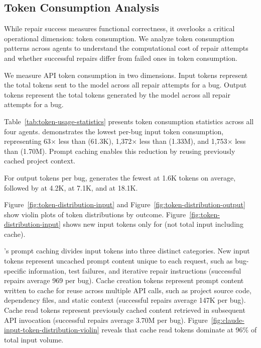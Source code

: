 \subsection{Token Consumption Analysis}
\label{subsec:token-usage}

While repair success measures functional correctness, it overlooks a critical operational dimension: token consumption. We analyze token consumption patterns across agents to understand the computational cost of repair attempts and whether successful repairs differ from failed ones in token consumption.

We measure API token consumption in two dimensions. Input tokens represent the total tokens sent to the model across all repair attempts for a bug. Output tokens represent the total tokens generated by the model across all repair attempts for a bug. 


Table~\ref{tab:token-usage-statistics} presents token consumption statistics across all four agents. \claudecode demonstrates the lowest per-bug input token consumption, representing 63$\times$ less than \codex (61.3K), 1,372$\times$ less than \geminicli (1.33M), and 1,753$\times$ less than \qwencode (1.70M). Prompt caching enables this reduction by reusing previously cached project context. 

For output tokens per bug, \codex generates the fewest at 1.6K tokens on average, followed by \geminicli at 4.2K, \qwencode at 7.1K, and \claudecode at 18.1K.

Figure~\ref{fig:token-distribution-input} and Figure~\ref{fig:token-distribution-output} show violin plots of token distributions by outcome. Figure~\ref{fig:token-distribution-input} shows new input tokens only for \claudecode (not total input including cache).

\claudecode's prompt caching divides input tokens into three distinct categories. New input tokens represent uncached prompt content unique to each request, such as bug-specific information, test failures, and iterative repair instructions (successful repairs average 969 per bug). Cache creation tokens represent prompt content written to cache for reuse across multiple API calls, such as project source code, dependency files, and static context (successful repairs average 147K per bug). Cache read tokens represent previously cached content retrieved in subsequent API invocation (successful repairs average 3.70M per bug). Figure~\ref{fig:claude-input-token-distribution-violin} reveals that cache read tokens dominate at 96\% of total input volume. 


